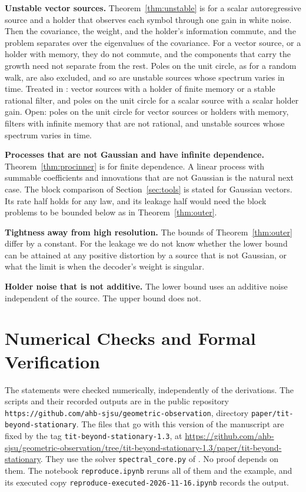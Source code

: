 \documentclass[11pt,onecolumn]{IEEEtran}
\begin{document}
\textbf{Unstable vector sources.} Theorem~\ref{thm:unstable} is for a
scalar autoregressive source and a holder that observes each symbol
through one gain in white noise. Then the covariance, the weight, and
the holder's information commute, and the problem separates over the
eigenvalues of the covariance. For a vector source, or a holder with
memory, they do not commute, and the components that carry the growth
need not separate from the rest. Poles on the unit circle, as for a
random walk, are also excluded, and so are unstable sources whose
spectrum varies in time. Treated in \cite{part4}: vector sources with a
holder of finite memory or a stable rational filter, and poles on the
unit circle for a scalar source with a scalar holder gain. Open: poles
on the unit circle for vector sources or holders with memory, filters
with infinite memory that are not rational, and unstable sources whose
spectrum varies in time.

\textbf{Processes that are not Gaussian and have infinite
dependence.} Theorem~\ref{thm:procinner} is for finite dependence. A
linear process with summable coefficients and innovations that are not
Gaussian is the natural next case. The block comparison of
Section~\ref{sec:tools} is stated for Gaussian vectors. Its rate half
holds for any law, and its leakage half would need the block problems
to be bounded below as in Theorem~\ref{thm:outer}.

\textbf{Tightness away from high resolution.} The bounds of
Theorem~\ref{thm:outer} differ by a constant. For the leakage we do
not know whether the lower bound can be attained at any positive
distortion by a source that is not Gaussian, or what the limit is when
the decoder's weight is singular.

\textbf{Holder noise that is not additive.} The lower bound uses an
additive noise independent of the source. The upper bound does not.

\appendices

\section{Numerical Checks and Formal Verification}
\label{app:numver}
\sloppy

The statements were checked numerically, independently of the
derivations. The scripts and their recorded outputs are in the public
repository
\texttt{https://github.com/ahb-sjsu/geometric-observation}, directory
\texttt{paper/tit-beyond-stationary}. The files that go with this
version of the manuscript are fixed by the tag
\texttt{tit-beyond-stationary-1.3}, at
\url{https://github.com/ahb-sjsu/geometric-observation/tree/tit-beyond-stationary-1.3/paper/tit-beyond-stationary}.
They use the solver \texttt{spectral\_core.py} of \cite{part2}. No proof
depends on them. The notebook \texttt{reproduce.ipynb} reruns all of
them and the example, and its executed copy
\texttt{reproduce-executed-2026-11-16.ipynb} records the output.
\end{document}
